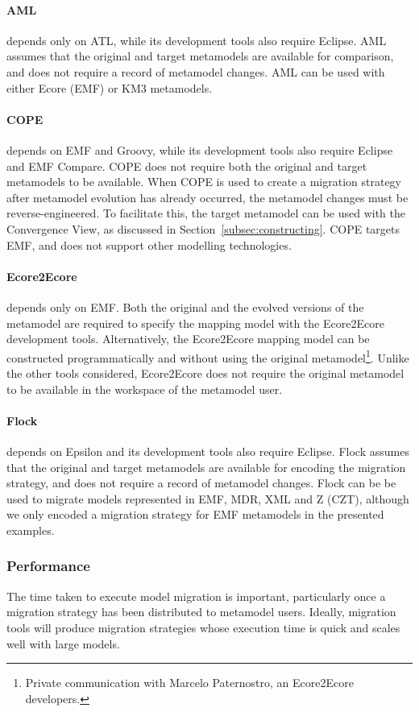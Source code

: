 \paragraph{AML} depends only on ATL, while its development tools also require Eclipse. AML assumes that the original and target metamodels are available for comparison, and does not require a record of metamodel changes. AML can be used with either Ecore (EMF) or KM3 metamodels.

\paragraph{COPE} depends on EMF and Groovy, while its development tools also require Eclipse and EMF Compare. COPE does not require both the original and target metamodels to be available. When COPE is used to create a migration strategy after metamodel evolution has already occurred, the metamodel changes must be reverse-engineered. To facilitate this, the target metamodel can be used with the Convergence View, as discussed in Section~\ref{subsec:constructing}. COPE targets EMF, and does not support other modelling technologies.

\paragraph{Ecore2Ecore} depends only on EMF. Both the original and the evolved versions of the metamodel are required to specify the mapping model with the Ecore2Ecore development tools. Alternatively, the Ecore2Ecore mapping model can be constructed programmatically and without using the original metamodel\footnote{Private communication with Marcelo Paternostro, an Ecore2Ecore developers.}. Unlike the other tools considered, Ecore2Ecore does not require the original metamodel to be available in the workspace of the metamodel user.

\paragraph{Flock} depends on Epsilon and its development tools also require Eclipse. Flock assumes that the original and target metamodels are available for encoding the migration strategy, and does not require a record of metamodel changes. Flock can be be used to migrate models represented in EMF, MDR, XML and Z (CZT), although we only encoded a migration strategy for EMF metamodels in the presented examples.


\subsubsection{Performance}
The time taken to execute model migration is important, particularly once a migration strategy has been distributed to metamodel users. Ideally, migration tools will produce migration strategies whose execution time is quick and scales well with large models.

